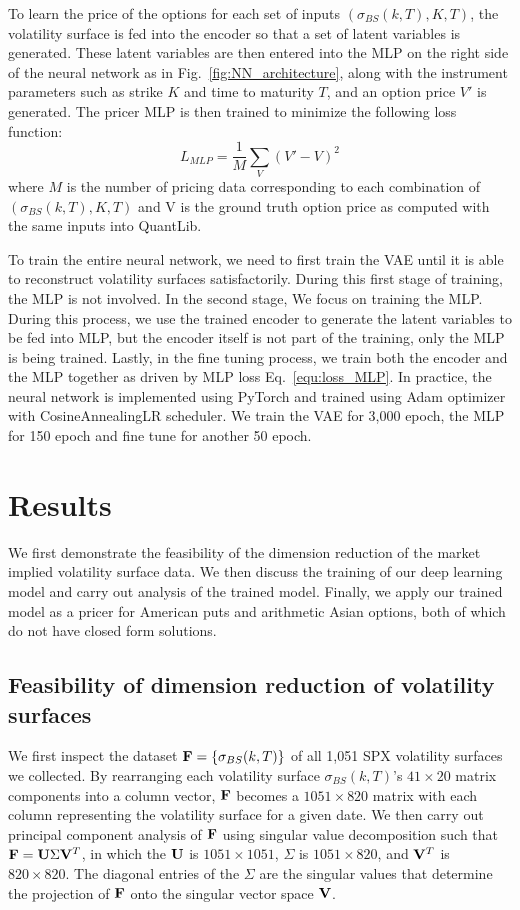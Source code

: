 \documentclass[%
 reprint,
 superscriptaddress,
nobibnotes,
 amsmath,amssymb,
 aip,
]{revtex4-2}
\begin{document}
To learn the price of the options for each set of inputs $(\sigma_{BS}(k,T),K,T)$, the volatility surface is fed into the encoder so that a set of latent variables is generated. These latent variables are then entered into the MLP on the right side of the neural network as in Fig.~\ref{fig:NN_architecture}, along with the instrument parameters such as strike $K$ and time to maturity $T$, and an option price $V'$ is generated. The pricer MLP is then trained to minimize the following loss function:
\begin{equation}
    L_{MLP} =\frac{1}{M} \sum_{V}(V' - V)^2
    \label{equ:loss_MLP}
\end{equation}
where $M$ is the number of pricing data corresponding to each combination of $(\sigma_{BS}(k,T),K,T)$ and V is the ground truth option price as computed with the same inputs into QuantLib.


To train the entire neural network, we need to first train the VAE until it is able to reconstruct volatility surfaces satisfactorily. During this first stage of training, the MLP is not involved. In the second stage, We focus on training the MLP. During this process, we use the trained encoder to generate the latent variables to be fed into MLP, but the encoder itself is not part of the training, only the MLP is being trained. Lastly, in the fine tuning process, we train both the encoder and the MLP together as driven by MLP loss Eq.~\eqref{equ:loss_MLP}. In practice, the neural network is implemented using PyTorch and trained using Adam optimizer with CosineAnnealingLR scheduler. We train the VAE for 3,000 epoch, the MLP for 150 epoch and fine tune for another 50 epoch.

\section{Results}
\label{sec:results}

We first demonstrate the feasibility of the dimension reduction of the market implied volatility surface data. We then discuss the training of our deep learning model and carry out analysis of the trained model. Finally, we apply our trained model as a pricer for American puts and arithmetic Asian options, both of which do not have closed form solutions.

\subsection{Feasibility of dimension reduction of volatility surfaces}
We first inspect the dataset $\vb{F} = \{\sigma_{BS}(k,T)\}$ of all 1,051 SPX volatility surfaces we collected. By rearranging each volatility surface $\sigma_{BS}(k,T)$'s  $41\times 20$ matrix components into a column vector, $\vb{F}$ becomes a $1051\times 820$ matrix with each column representing the volatility surface for a given date. We then carry out principal component analysis of $\vb{F}$ using singular value decomposition such that $\vb{F} = \vb{U}\Sigma \vb{V}^T$, in which the $\vb{U}$ is $1051\times 1051$, $\Sigma$ is $1051\times 820$, and $\vb{V}^T$ is $820\times 820$. The diagonal entries of the $\Sigma$ are the singular values that determine the projection of $\vb{F}$ onto the singular vector space $\vb{V}$.
\end{document}
